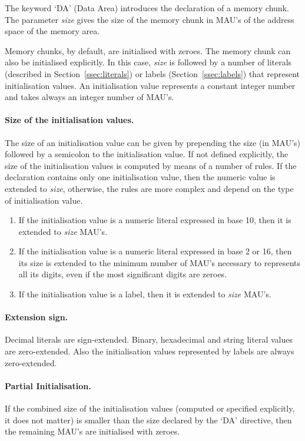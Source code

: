 \documentclass[twoside]{tceusermanual}
\begin{document}
The keyword `DA' (Data Area) introduces the declaration of a memory chunk.
The parameter \emph{size} gives the size of the memory chunk in MAU's of the
address space of the memory area.

Memory chunks, by default, are initialised with zeroes. The memory chunk can
also be initialised explicitly. In this case, \emph{size} is followed by a
number of literals (described in Section~\ref{ssec:literals}) or labels
(Section~\ref{ssec:labels}) that represent initialisation values.
%
An initialisation value represents a constant integer number and takes
always an integer number of MAU's.

\paragraph{Size of the initialisation values.}
The size of an initialisation value can be given by prepending the size (in
MAU's) followed by a semicolon to the initialisation value.
%
If not defined explicitly, the size of the initialisation values is computed
by means of a number of rules. If the declaration contains only one
initialisation value, then the numeric value is extended to \emph{size},
otherwise, the rules are more complex and depend on the type of
initialisation value.

\begin{enumerate}
\item %
  If the initialisation value is a numeric literal expressed in base 10,
  then it is extended to \emph{size} MAU's.
\item %
  If the initialisation value is a numeric literal expressed in base 2 or
  16, then its size is extended to the minimum number of MAU's necessary to
  represents all its digits, even if the most significant digits are zeroes.
\item %
  If the initialisation value is a label, then it is extended to \emph{size}
  MAU's.
\end{enumerate}

\paragraph{Extension sign.}
Decimal literals are sign-extended. Binary, hexadecimal and string literal
values are zero-extended. Also the initialisation values represented by
labels are always zero-extended.

\paragraph{Partial Initialisation.}
If the combined size of the initialisation values (computed or specified
explicitly, it does not matter) is smaller than the size declared by the `DA'
directive, then the remaining MAU's are initialised with zeroes.
\end{document}
